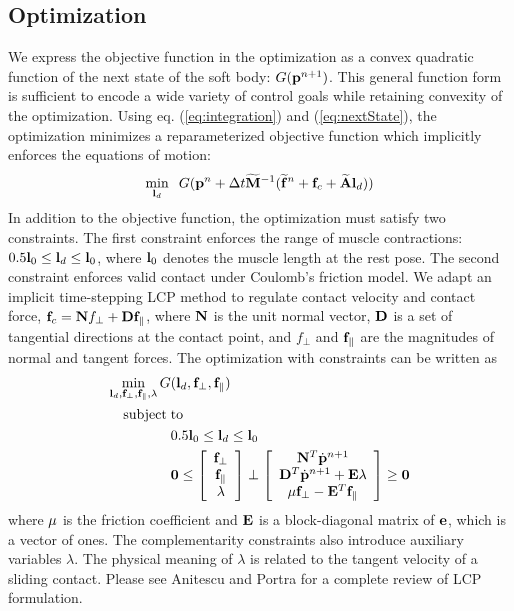 \subsection{Optimization}
We express the objective function in the optimization as a convex
quadratic function of the next state of the soft body: $G(\mathbf{p}^{n+1})$.
This general function form is sufficient to encode a wide variety of
control goals while retaining convexity of the optimization. Using
eq. (\ref{eq:integration}) and (\ref{eq:nextState}), the optimization
minimizes a reparameterized objective function which implicitly enforces
the equations of motion:
\begin{equation}
\min_{\mathbf{l}_d} \;\;G(\mathbf{p}^{n}+\Delta t \mathbf{\widetilde{M}}^{-1}(\mathbf{\widetilde{f}}^n +\mathbf{f}_c + \mathbf{\widetilde{A}} \mathbf{l}_d))
\label{eq:objectiveFunction}
\end{equation}
In addition to the objective function, the optimization must satisfy two
constraints. The first constraint enforces the range of muscle
contractions: $0.5 \mathbf{l}_0 \leq \mathbf{l}_d \leq \mathbf{l}_0$, where $\mathbf{l}_0$ denotes the muscle length at the rest pose. The second constraint enforces valid contact under Coulomb's friction model. We adapt an implicit time-stepping LCP method to regulate contact velocity and contact force, $\mathbf{f}_c = \mathbf{N} f_\perp + \mathbf{D}\mathbf{f}_\parallel$, where $\mathbf{N}$ is the unit normal vector, $\mathbf{D}$ is a set of tangential directions at the contact point, and $f_\perp$ and $\mathbf{f}_\parallel$ are the magnitudes of normal and tangent forces. The optimization with constraints can be written as
\begin{align}
\label{eqn:optimization}
 \min_{\mathbf{l}_d,\mathbf{f}_\perp,\mathbf{f}_\parallel,\lambda} G&(\mathbf{l}_d,\mathbf{f}_\perp,\mathbf{f}_\parallel)  \\
\nonumber  \mathrm{subject\;} &\mathrm{to} \\
\nonumber   &0.5\mathbf{l}_0 \leq \mathbf{l}_d \leq \mathbf{l}_0 \\
\nonumber  &\mathbf{0} \leq \left[ \begin{array}{c} \mathbf{f}_\perp \\ \mathbf{f}_\parallel \\ \lambda \end{array} \right] \perp
 \left[ \begin{array}{c} \mathbf{N}^T\dot{\mathbf{p}}^{n+1} \\ \mathbf{D}^T \dot{\mathbf{p}}^{n+1} + \mathbf{E} \lambda \\ \mu \mathbf{f}_\perp - \mathbf{E}^T \mathbf{f}_\parallel \end{array} \right] \geq \mathbf{0}
\end{align}
where $\mathbf{\mu}$ is the friction coefficient and $\mathbf{E}$ is a
block-diagonal matrix of $\mathbf{e}$, which is a vector of ones. The
complementarity constraints also introduce auxiliary variables
$\lambda$. The physical meaning of $\lambda$ is related to the tangent
velocity of a sliding contact. Please see Anitescu and Portra
\cite{Anitescu:1997} for a complete review of LCP formulation.

